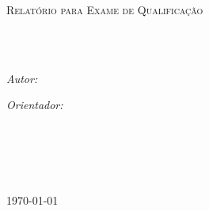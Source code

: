 \documentclass[
11pt, %
portuguese, %
singlespacing, %
headsepline, %
chapterinoneline, %
consistentlayout, %
]{MastersDoctoralThesis} %
\author{Juliana Cavalcanti Correa} %
\begin{document}
\frontmatter %

\pagestyle{plain} %


\begin{titlepage}
\begin{center}

\vspace*{.06\textheight}
{\scshape\LARGE \univname\par}\vspace{1.5cm} %
\textsc{\Large Relatório para Exame de Qualificação}\\[0.5cm] %

\HRule \\[0.4cm] %
{\huge \bfseries \ttitle\par}\vspace{0.4cm} %
\HRule \\[1.5cm] %
 
\begin{minipage}[t]{0.4\textwidth}
\begin{flushleft} \large
\emph{Autor:}\\
\href{mailto:julicc@ime.usp.br}{\authorname} %
\end{flushleft}
\end{minipage}
\begin{minipage}[t]{0.4\textwidth}
\begin{flushright} \large
\emph{Orientador:} \\
\href{mailto:fujita@ime.usp.br}{\supname} %
\end{flushright}
\end{minipage}\\[3cm]
 
\vfill

\groupname\\\deptname\\[2cm] %
 
\vfill

{\large \today}\\[4cm] %
 
\vfill
\end{center}
\end{titlepage}
\end{document}
